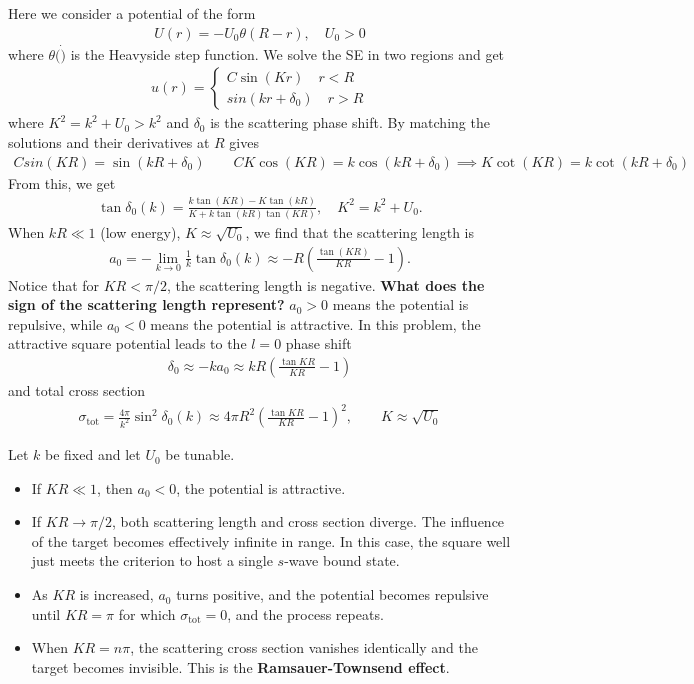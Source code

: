\documentclass{book}
\theoremstyle{definition}
\newcommand{\f}[2]{\frac{#1}{#2}}
\newcommand{\lp}{\left(}
\newcommand{\rp}{\right)}
\begin{document}
Here we consider a potential of the form
\begin{align*}
	U(r) = -U_0 \theta(R-r), \quad U_0 > 0
\end{align*}
where $\theta(\dot)$ is the Heavyside step function. We solve the SE in two regions and get 
\begin{align*}
	u(r) = \begin{cases}
		C\sin(Kr) \quad r < R \\
		sin(kr + \delta_0) \quad r > R
	\end{cases}
\end{align*}
where $K^2 = k^2 + U_0 > k^2$ and $\delta_0$ is the scattering phase shift. By matching the solutions and their derivatives at $R$ gives
\begin{align*}
	Csin(KR) = \sin(kR + \delta_0) \quad\quad CK\cos(KR) = k\cos(kR + \delta_0) \implies K\cot(KR) = k\cot(kR+ \delta_0)
\end{align*}
From this, we get
\begin{align*}
	\tan \delta_0 (k)= \f{k\tan(KR) - K\tan(kR)}{K + k\tan(kR)\tan(KR)}, \quad K^2 = k^2 + U_0.
\end{align*}
When $kR \ll 1$ (low energy), $K \approx \sqrt{U_0}$, we find that the scattering length is 
\begin{align*}
	a_0 = -\lim_{k\to 0} \f{1}{k}\tan \delta_0(k) \approx -R \lp \f{\tan(KR)}{KR} - 1 \rp.
\end{align*}
Notice that for $KR < \pi/2$, the scattering length is negative. \textbf{What does the sign of the scattering length represent?} $a_0 > 0$ means the potential is repulsive, while $a_0 < 0$ means the potential is attractive. In this problem, the attractive square potential leads to the $l=0$ phase shift
\begin{align*}
	\delta_0 \approx -ka_0 \approx kR \lp \f{\tan KR}{KR} - 1 \rp
\end{align*}
and total cross section
\begin{align*}
	\sigma_\text{tot} = \f{4\pi}{k^2}\sin^2 \delta_0(k) \approx 4\pi R^2 \lp \f{\tan KR}{KR} - 1 \rp^2, \quad \quad K \approx \sqrt{U_0}
\end{align*}

Let $k$ be fixed and let $U_0$ be tunable. 
\begin{itemize}
	\item If $KR \ll 1$, then $a_0 < 0$, the potential is attractive.
	
	\item If $KR \to \pi/2$, both scattering length and cross section diverge. The influence of the target becomes effectively infinite in range. In this case, the square well just meets the criterion to host a single $s$-wave bound state. 
	
	\item As $KR$ is increased, $a_0$ turns positive, and the potential becomes repulsive until $KR = \pi$ for which $\sigma_\text{tot} = 0$, and the process repeats. 
	
	\item When $KR = n\pi$, the scattering cross section vanishes identically and the target becomes invisible. This is the \textbf{Ramsauer-Townsend effect}.
\end{itemize}
\end{document}
